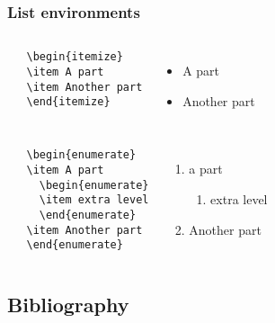\documentclass[aspectratio=169]{beamer}
\begin{document}
\begin{frame}[fragile]
 \frametitle{List environments}

 \begin{columns}[c]
   \begin{verbatim}
   \begin{itemize}
   \item A part
   \item Another part
   \end{itemize}
   \end{verbatim}

   \begin{itemize}
     \item A part
     \item Another part
   \end{itemize}
 \end{columns}

 \pause

 \begin{columns}[c]
   \begin{verbatim}
   \begin{enumerate}
   \item A part
     \begin{enumerate}
     \item extra level
     \end{enumerate}
   \item Another part
   \end{enumerate}
   \end{verbatim}

   \begin{enumerate}
     \item a part
     \begin{enumerate}
       \item extra level
     \end{enumerate}
     \item Another part
   \end{enumerate}
 \end{columns}
\end{frame}

\subsection{Bibliography}
\end{document}
